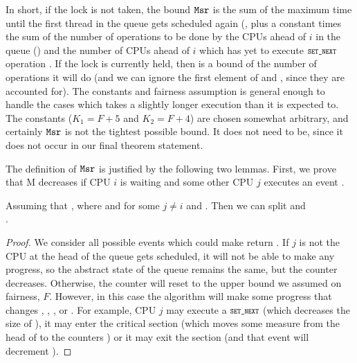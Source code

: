 In short, if the lock is not taken, the bound ${\mathrm{\texttt{Msr}}}$ is the sum of the
maximum time until the first thread in the queue gets scheduled again
(, plus a constant times
the sum of the number of operations to be done
by the CPUs ahead of $i$ in the queue () 
and the number of CPUs ahead of $i$ which has
yet to execute $\SETNEXT$ operation 
. If the lock is currently
held, then  is a bound of the number of operations it will
do
(and we can ignore the first element of  and , since they are
accounted for).
The constants and fairness assumption is general enough to handle the cases which takes a slightly longer execution than it is expected to.
The constants ($K_1 = F+5$ and $K_2 = F+4$) are chosen somewhat
arbitrary, and certainly ${\mathrm{\texttt{Msr}}}$ is not the tightest possible bound. It
does not need to be, since it does not occur in our final theorem
statement.

The definition of ${\mathrm{\texttt{Msr}}}$ is justified by the following two
lemmas. First, we prove that M decreases if CPU $i$ is waiting and some other CPU
$j$ executes an event .

\begin{lemma}
\label{lem:chapter:mcslock:MCS_CalLock_progress_onestep}
Assuming that , where
 and  
for some $j\neq i$ and
  .
Then we can split 
and\\ .
\end{lemma}

\begin{proof}
 We consider all possible events
 which could make  return . If $j$ is not the 
CPU at the head of the queue gets scheduled, it will not be
able to make any progress, so the abstract state of the queue remains the same,
but the counter  decreases.
Otherwise, the counter  will reset to the upper bound we assumed on fairness, $F$. 
However, in this case the algorithm will make some progress that changes , , , or .
For example, CPU $j$ may execute a $\SETNEXT$ (which decreases the size of
), it may enter the critical section (which moves some measure from
the head of  to the counters ) or it may exit the section
(and that event will decrement ).
\end{proof}


